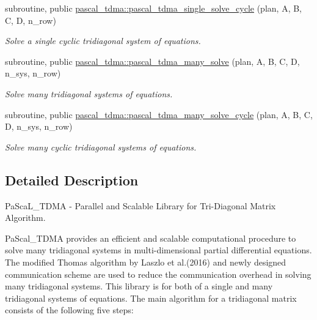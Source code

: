\begin{DoxyCompactItemize}
subroutine, public \mbox{\hyperlink{namespacepascal__tdma_ac8e377fa86c75126380f0196f6046043}{pascal\+\_\+tdma\+::pascal\+\_\+tdma\+\_\+single\+\_\+solve\+\_\+cycle}} (plan, A, B, C, D, n\+\_\+row)
\begin{DoxyCompactList}\small\item\em Solve a single cyclic tridiagonal system of equations. \end{DoxyCompactList}\item 
subroutine, public \mbox{\hyperlink{namespacepascal__tdma_afa0c78b8377f5fe1059907befda3c940}{pascal\+\_\+tdma\+::pascal\+\_\+tdma\+\_\+many\+\_\+solve}} (plan, A, B, C, D, n\+\_\+sys, n\+\_\+row)
\begin{DoxyCompactList}\small\item\em Solve many tridiagonal systems of equations. \end{DoxyCompactList}\item 
subroutine, public \mbox{\hyperlink{namespacepascal__tdma_acbaed65e67ecbfd92a8f1d51d1b69fd5}{pascal\+\_\+tdma\+::pascal\+\_\+tdma\+\_\+many\+\_\+solve\+\_\+cycle}} (plan, A, B, C, D, n\+\_\+sys, n\+\_\+row)
\begin{DoxyCompactList}\small\item\em Solve many cyclic tridiagonal systems of equations. \end{DoxyCompactList}\end{DoxyCompactItemize}


\subsection{Detailed Description}
Pa\+Sca\+L\+\_\+\+T\+D\+MA -\/ Parallel and Scalable Library for Tri-\/\+Diagonal Matrix Algorithm. 

Pa\+Scal\+\_\+\+T\+D\+MA provides an efficient and scalable computational procedure to solve many tridiagonal systems in multi-\/dimensional partial differential equations. The modified Thomas algorithm by Laszlo et al.(2016) and newly designed communication scheme are used to reduce the communication overhead in solving many tridiagonal systems. This library is for both of a single and many tridiagonal systems of equations. The main algorithm for a tridiagonal matrix consists of the following five steps\+:

